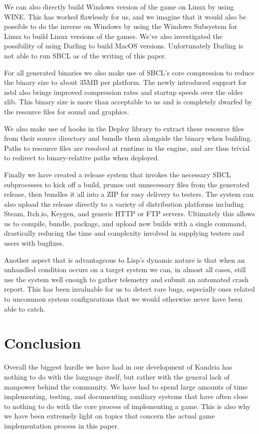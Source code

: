 \documentclass[format=sigconf]{acmart}
\begin{document}
We can also directly build Windows version of the game on Linux by using WINE\cite{wine}. This has worked flawlessly for us, and we imagine that it would also be possible to do the inverse on Windows by using the Windows Subsystem for Linux to build Linux versions of the games. We've also investigated the possibility of using Darling to build MacOS versions. Unfortunately Darling is not able to run SBCL as of the writing of this paper.

For all generated binaries we also make use of SBCL's core compression to reduce the binary size to about 35MB per platform. The newly introduced support for zstd also brings improved compression rates and startup speeds over the older zlib. This binary size is more than acceptable to us and is completely dwarfed by the resource files for sound and graphics.

We also make use of hooks in the Deploy library to extract these resource files from their source directory and bundle them alongside the binary when building. Paths to resource files are resolved at runtime in the engine, and are thus trivial to redirect to binary-relative paths when deployed.

Finally we have created a release system that invokes the necessary SBCL subprocesses to kick off a build, prunes out unnecessary files from the generated release, then bundles it all into a ZIP for easy delivery to testers. The system can also upload the release directly to a variety of distribution platforms including Steam, Itch.io, Keygen, and generic HTTP or FTP servers. Ultimately this allows us to compile, bundle, package, and upload new builds with a single command, drastically reducing the time and complexity involved in supplying testers and users with bugfixes.

Another aspect that is advantageous to Lisp's dynamic nature is that when an unhandled condition occurs on a target system we can, in almost all cases, still use the system well enough to gather telemetry and submit an automated crash report. This has been invaluable for us to detect rare bugs, especially ones related to uncommon system configurations that we would otherwise never have been able to catch.

\section{Conclusion}\label{conclusion}
Overall the biggest hurdle we have had in our development of Kandria has nothing to do with the language itself, but rather with the general lack of manpower behind the community. We have had to spend large amounts of time implementing, testing, and documenting auxiliary systems that have often close to nothing to do with the core process of implementing a game. This is also why we have been extremely light on topics that concern the actual game implementation process in this paper.
\end{document}
